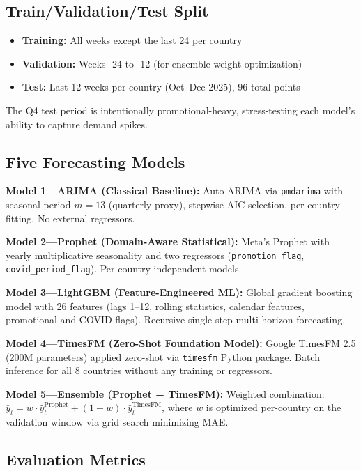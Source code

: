 \documentclass[10pt,twocolumn,a4paper]{article}
\begin{document}
\subsection{Train/Validation/Test Split}

\begin{itemize}[leftmargin=*,noitemsep,topsep=2pt]
    \item \textbf{Training:} All weeks except the last 24 per country
    \item \textbf{Validation:} Weeks -24 to -12 (for ensemble weight optimization)
    \item \textbf{Test:} Last 12 weeks per country (Oct--Dec 2025), 96 total points
\end{itemize}

The Q4 test period is intentionally promotional-heavy, stress-testing each model's ability to capture demand spikes.

\subsection{Five Forecasting Models}

\textbf{Model 1---ARIMA (Classical Baseline):}
Auto-ARIMA via \texttt{pmdarima} with seasonal period $m\!=\!13$ (quarterly proxy), stepwise AIC selection, per-country fitting. No external regressors.

\textbf{Model 2---Prophet (Domain-Aware Statistical):}
Meta's Prophet with yearly multiplicative seasonality and two regressors (\texttt{promotion\_flag}, \texttt{covid\_period\_flag}). Per-country independent models.

\textbf{Model 3---LightGBM (Feature-Engineered ML):}
Global gradient boosting model with 26 features (lags 1--12, rolling statistics, calendar features, promotional and COVID flags). Recursive single-step multi-horizon forecasting.

\textbf{Model 4---TimesFM (Zero-Shot Foundation Model):}
Google TimesFM 2.5 (200M parameters) applied zero-shot via \texttt{timesfm} Python package. Batch inference for all 8 countries without any training or regressors.

\textbf{Model 5---Ensemble (Prophet + TimesFM):}
Weighted combination: $\hat{y}_t = w \cdot \hat{y}^{\text{Prophet}}_t + (1-w) \cdot \hat{y}^{\text{TimesFM}}_t$, where $w$ is optimized per-country on the validation window via grid search minimizing MAE.

\subsection{Evaluation Metrics}
\end{document}
